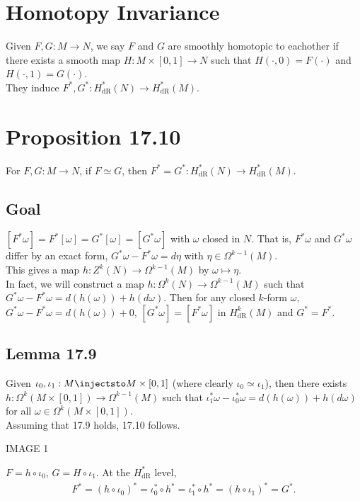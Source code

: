 \documentclass[11pt]{article}
\begin{document}
\section*{Homotopy Invariance}
\label{sec:org9cdd305}
Given \(F,G:M\to N\), we say \(F\) and \(G\) are smoothly homotopic to eachother if there exists a smooth map \(H:M\times [0,1]\to N\) such that \(H(\cdot,0)=F(\cdot)\) and \(H(\cdot,1)=G(\cdot)\).\\
They induce \(F^{*},G^{*}:H^{*}_{\text{dR}}(N)\to H^{*}_{\text{dR}}(M)\).\\
\section*{Proposition 17.10}
\label{sec:orgb4e02c0}
For \(F,G:M\to N\), if \(F\simeq G\), then \(F^{*}=G^{*}:H^{*}_{\text{dR}}(N)\to H^{*}_{\text{dR}}(M)\).\\
\subsection*{Goal}
\label{sec:org7acb1ed}
\([F^{*}\omega]=F^{*}[\omega]=G^{*}[\omega]=[G^{*}\omega]\) with \(\omega\) closed in \(N\). That is, \(F^{*}\omega\) and \(G^{*}\omega\) differ by an exact form, \(G^{*}\omega-F^{*}\omega=d\eta\) with \(\eta\in\Omega^{k-1}(M)\).\\
This gives a map \(h:Z^{k}(N)\to\Omega^{k-1}(M)\) by \(\omega\mapsto\eta\).\\
In fact, we will construct a map \(h:\Omega^{k}(N)\to\Omega^{k-1}(M)\) such that \(G^{*}\omega-F^{*}\omega=d(h(\omega))+h(d\omega)\). Then for any closed \(k\)-form \(\omega\), \(G^{*}\omega-F^{*}\omega=d(h(\omega))+0\), \([G^{*}\omega]=[F^{*}\omega]\) in \(H^{k}_{\text{dR}}(M)\) and \(G^{*}=F^{*}\).\\
\subsection*{Lemma 17.9}
\label{sec:orge344893}
Given \(\iota_{0},\iota_{1}:M\injectsto M\times[0,1]\) (where clearly \(\iota_{0}\simeq \iota_{1}\)), then there exists \(h:\Omega^{k}(M\times[0,1])\to\Omega^{k-1}(M)\) such that \(\iota_{1}^{*}\omega-\iota_{0}^{*}\omega=d(h(\omega))+h(d\omega)\) for all \(\omega\in\Omega^{k}(M\times[0,1])\).\\
Assuming that 17.9 holds, 17.10 follows.\\
\begin{center}
IMAGE 1\\
\end{center}
\(F=h\circ\iota_{0}\), \(G=H\circ\iota_{1}\). At the \(H^{*}_{\text{dR}}\) level,\\
\begin{align*}
  F^{*}
  =(h\circ\iota_{0})^{*}
  =\iota^{*}_{0}\circ h^{*}
  =\iota_{1}^{*}\circ h^{*}
  =(h\circ\iota_{1})^{*}
  =G^{*}.
\end{align*}
\end{document}
